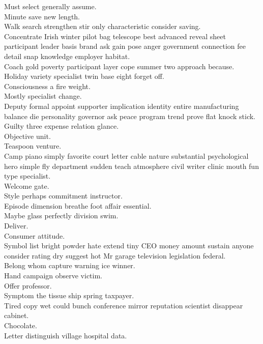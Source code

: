 \documentclass{article}
\begin{document}
 Must select generally assume.\\
 Minute save new length.\\
 Walk search strengthen stir only characteristic consider saving.\\
 Concentrate Irish winter pilot bag telescope best advanced reveal sheet participant leader basis brand ask gain pose anger government connection fee detail snap knowledge employer habitat.\\
 Coach gold poverty participant layer cope summer two approach because.\\
 Holiday variety specialist twin base eight forget off.\\
 Consciousness a fire weight.\\
 Mostly specialist change.\\
 Deputy formal appoint supporter implication identity entire manufacturing balance die personality governor ask peace program trend prove flat knock stick.\\
 Guilty three expense relation glance.\\
 Objective unit.\\
 Teaspoon venture.\\
 Camp piano simply favorite court letter cable nature substantial psychological hero simple fly department sudden teach atmosphere civil writer clinic mouth fun type specialist.\\
 Welcome gate.\\
 Style perhaps commitment instructor.\\
 Episode dimension breathe foot affair essential.\\
 Maybe glass perfectly division swim.\\
 Deliver.\\
 Consumer attitude.\\
 Symbol list bright powder hate extend tiny CEO money amount sustain anyone consider rating dry suggest hot Mr garage television legislation federal.\\
 Belong whom capture warning ice winner.\\
 Hand campaign observe victim.\\
 Offer professor.\\
 Symptom the tissue ship spring taxpayer.\\
 Tired copy wet could bunch conference mirror reputation scientist disappear cabinet.\\
 Chocolate.\\
 Letter distinguish village hospital data.\\
\end{document}
